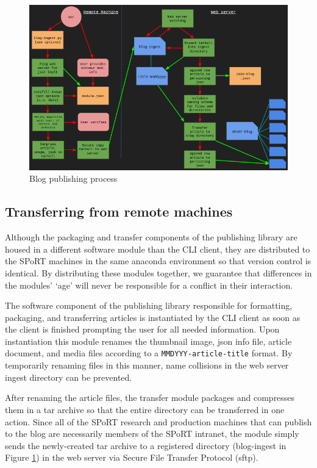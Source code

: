 \documentclass[12pt]{article}
\begin{document}
\begin{figure}[h]
  \centering
  \includegraphics[width=.8\linewidth]{./figures/publishing.png}
  \caption{Blog publishing process}
  \label{publishing process} %
\end{figure}


\subsection{Transferring from remote machines}
\label{remote machine publishing}

Although the packaging and transfer components of the publishing library are housed in a different software module than the CLI client, they are distributed to the SPoRT machines in the same anaconda environment so that version control is identical. By distributing these modules together, we guarantee that differences in the modules' `age' will never be responsible for a conflict in their interaction.

The software component of the publishing library responsible for formatting, packaging, and transferring articles is instantiated by the CLI client as soon as the client is finished prompting the user for all needed information. Upon instantiation this module renames the thumbnail image, json info file, article document, and media files according to a \texttt{MMDYYY-article-title} format. By temporarily renaming files in this manner, name collisions in the web server ingest directory can be prevented.

After renaming the article files, the transfer module packages and compresses them in a tar archive so that the entire directory can be transferred in one action. Since all of the SPoRT research and production machines that can publish to the blog are necessarily members of the SPoRT intranet, the module simply sends the newly-created tar archive to a registered directory (blog-ingest in Figure \ref{publishing process}) in the web server via Secure File Transfer Protocol (sftp).
\end{document}
